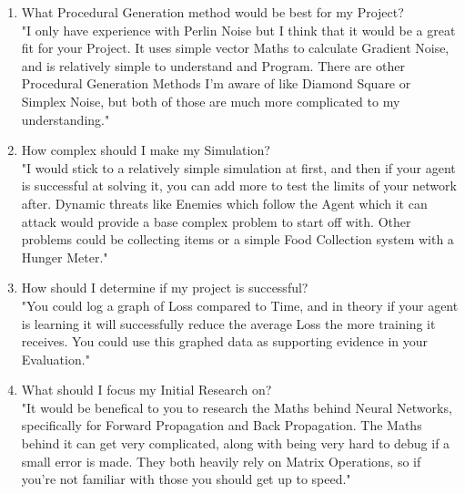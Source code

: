 \begin{flushleft}
\begin{enumerate}
                    \vspace{0.5cm}
                    \item {\large What Procedural Generation method would be best for my Project?} \\
                    \vspace{0.2cm}
                    "I only have experience with Perlin Noise but I think that it would be a great fit for your Project. It uses simple vector Maths
                    to calculate Gradient Noise, and is relatively simple to understand and Program. There are other Procedural Generation Methods
                    I'm aware of like Diamond Square or Simplex Noise, but both of those are much more complicated to my understanding."

                    \vspace{0.5cm}
                    \item {\large How complex should I make my Simulation?} \\
                    \vspace{0.2cm}
                    "I would stick to a relatively simple simulation at first, and then if your agent is successful at solving it, you can add more
                    to test the limits of your network after. Dynamic threats like Enemies which follow the Agent which it can attack would provide a base 
                    complex problem to start off with. Other problems could be collecting items or a simple Food Collection system with a Hunger Meter."

                    \vspace{0.5cm}
                    \item {\large How should I determine if my project is successful?} \\
                    \vspace{0.2cm}
                    "You could log a graph of Loss compared to Time, and in theory if your agent is learning it will successfully reduce the average Loss 
                    the more training it receives. You could use this graphed data as supporting evidence in your Evaluation."

                    \vspace{0.5cm}
                    \item {\large What should I focus my Initial Research on?} \\
                    \vspace{0.2cm}
                    "It would be benefical to you to research the Maths behind Neural Networks, specifically for Forward Propagation
                    and Back Propagation. The Maths behind it can get very complicated, along with being very hard to debug if a small error is made.
                    They both heavily rely on Matrix Operations, so if you're not familiar with those you should get up to speed."


\end{enumerate}
\end{flushleft}
